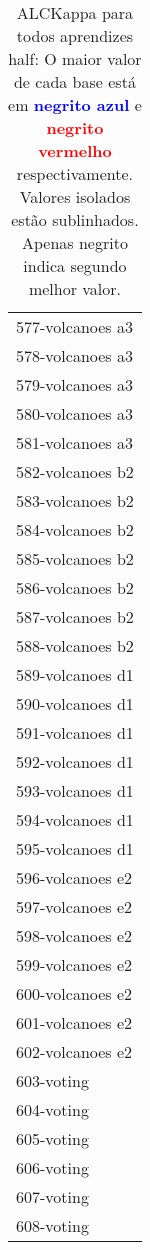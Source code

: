 \begin{table}[h]
\caption{ALCKappa para todos aprendizes half: O maior valor de cada base está em \textcolor{blue}{\textbf{negrito azul}} e \textcolor{red}{\textbf{negrito vermelho}} respectivamente. Valores isolados estão sublinhados. Apenas negrito indica segundo melhor valor.}
\begin{center}\begin{tabular}{l}
 & \\ \hline 577-volcanoes a3 &  \\
578-volcanoes a3 &  \\
579-volcanoes a3 &  \\
580-volcanoes a3 &  \\
581-volcanoes a3 &  \\
582-volcanoes b2 &  \\
583-volcanoes b2 &  \\ \hline
584-volcanoes b2 &  \\
585-volcanoes b2 &  \\
586-volcanoes b2 &  \\
587-volcanoes b2 &  \\
588-volcanoes b2 &  \\
589-volcanoes d1 &  \\
590-volcanoes d1 &  \\ \hline
591-volcanoes d1 &  \\
592-volcanoes d1 &  \\
593-volcanoes d1 &  \\
594-volcanoes d1 &  \\
595-volcanoes d1 &  \\
596-volcanoes e2 &  \\
597-volcanoes e2 &  \\ \hline
598-volcanoes e2 &  \\
599-volcanoes e2 &  \\
600-volcanoes e2 &  \\
601-volcanoes e2 &  \\
602-volcanoes e2 &  \\
603-voting &  \\
604-voting &  \\ \hline
605-voting &  \\
606-voting &  \\
607-voting &  \\
608-voting &  \\\end{tabular}\label{stratsALCKappa18AllReduxb}
\end{center}
\end{table}
